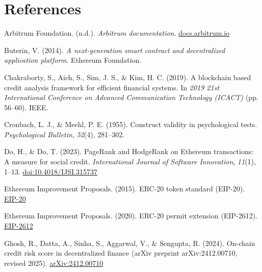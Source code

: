 \clearpage
{}
\section*{References}
\label{sec:references}

\hangindent=0.5in  Arbitrum Foundation. (n.d.). \textit{Arbitrum documentation}. \href{https://docs.arbitrum.io/}{docs.arbitrum.io}\par

\hangindent=0.5in  Buterin, V. (2014). \textit{A next-generation smart contract and decentralized application platform}. Ethereum Foundation.\par

\hangindent=0.5in  Chakraborty, S., Aich, S., Sim, J. S., \& Kim, H. C. (2019). A blockchain based credit analysis framework for efficient financial systems. In \textit{2019 21st International Conference on Advanced Communication Technology (ICACT)} (pp. 56--60). IEEE.\par

\hangindent=0.5in  Cronbach, L. J., \& Meehl, P. E. (1955). Construct validity in psychological tests. \textit{Psychological Bulletin}, \textit{52}(4), 281--302.\par

\hangindent=0.5in  Do, H., \& Do, T. (2023). PageRank and HodgeRank on Ethereum transactions: A measure for social credit. \textit{International Journal of Software Innovation}, \textit{11}(1), 1--13. \href{https://doi.org/10.4018/IJSI.315737}{doi:10.4018/IJSI.315737}\par

\hangindent=0.5in  Ethereum Improvement Proposals. (2015). ERC-20 token standard (EIP-20). \href{https://eips.ethereum.org/EIPS/eip-20}{EIP-20}\par

\hangindent=0.5in  Ethereum Improvement Proposals. (2020). ERC-20 permit extension (EIP-2612). \href{https://eips.ethereum.org/EIPS/eip-2612}{EIP-2612}\par

\hangindent=0.5in  Ghosh, R., Datta, A., Sinha, S., Aggarwal, V., \& Sengupta, R. (2024). On-chain credit risk score in decentralized finance (arXiv preprint arXiv:2412.00710, revised 2025). \href{https://arxiv.org/abs/2412.00710}{arXiv:2412.00710}\par

